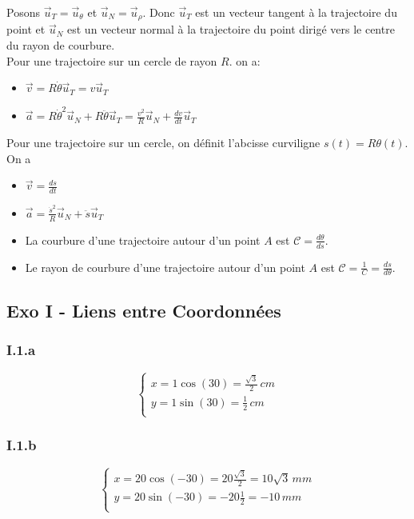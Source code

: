 \documentclass[]{book}
\theoremstyle{definition}
\begin{document}
Posons $\vec{u}_{T} = \vec{u}_{\theta}$ et $\vec{u}_{N} = \vec{u}_{\rho}$. Donc $\vec{u}_{T}$ est un vecteur tangent \`a la trajectoire du point et $\vec{u}_{N}$ est un vecteur normal \`a la trajectoire du point dirig\'e vers le centre du rayon de courbure.\\

Pour une trajectoire sur un cercle de rayon $R$. on a:

\begin{itemize}
\item $\vec{v} = R\dot{\theta}\vec{u}_{T} = v\vec{u}_{T}$
\item $\vec{a} = R\dot{\theta}^2\vec{u}_{N} + R\ddot{\theta}\vec{u}_{T}= \frac{v^2}{R}\vec{u}_{N} + \frac{dv}{dt}\vec{u}_{T}$
\end{itemize}


Pour une trajectoire sur un cercle, on d\'efinit l'abcisse curviligne $s(t)=R\theta(t)$. On a
\begin{itemize}
\item $\vec{v} = \frac{ds}{dt}$
\item $\vec{a} = \frac{\dot{s}^2}{R}\vec{u}_{N} + \ddot{s}\vec{u}_{T}$
\item La courbure d'une trajectoire autour d'un point $A$ est $\mathcal{C} = \frac{d\theta}{ds}$. 
\item Le rayon de courbure d'une trajectoire autour d'un point $A$ est $\mathcal{C} = \frac{1}{C} = \frac{ds}{d\theta}$.
\end{itemize}



\subsection*{Exo I - Liens entre Coordonn\'ees}
\subsubsection*{I.1.a}
$$
\left\{
\begin{array}{l }
	x = 1 \cos(30) =  \frac{\sqrt{3}}{2}\, cm\\
	y = 1 \sin(30) =  \frac{1}{2}\, cm\\
\end{array}
\right. 
$$

\subsubsection*{I.1.b}
$$
\left\{
\begin{array}{l }
	x = 20 \cos(-30) =  20 \frac{\sqrt{3}}{2} = 10\sqrt{3}\, mm\\
	y = 20 \sin(-30) =  -20 \frac{1}{2} = -10\, mm\\
\end{array}
\right. 
$$
\end{document}
